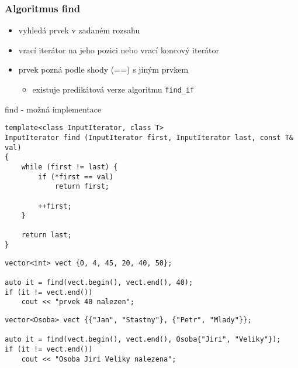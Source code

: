 

\begin{frame}[fragile]
\frametitle{Algoritmus find}
\begin{block}{}
\begin{itemize}
\item vyhledá prvek v zadaném rozsahu
\item vrací iterátor na jeho pozici nebo vrací koncový iterátor
\item prvek pozná podle shody (==) s jiným prvkem
\begin{itemize}
\item existuje predikátová verze algoritmu \lstinline|find_if|
\end{itemize}
\end{itemize}
\end{block}
\end{frame}



\begin{frame}[fragile]
\begin{block}{find - možná implementace}
\begin{lstlisting}
template<class InputIterator, class T>
InputIterator find (InputIterator first, InputIterator last, const T& val)
{
	while (first != last) {
		if (*first == val) 
			return first;
		
		++first;
	}
	
	return last;
}		
\end{lstlisting}
\end{block}
\end{frame}

\begin{frame}[fragile]
\begin{yesblock}
\begin{lstlisting}
vector<int> vect {0, 4, 45, 20, 40, 50};

auto it = find(vect.begin(), vect.end(), 40);
if (it != vect.end()) 
	cout << "prvek 40 nalezen";
\end{lstlisting}
\end{yesblock}

\begin{yesblock}
\begin{lstlisting}
vector<Osoba> vect {{"Jan", "Stastny"}, {"Petr", "Mlady"}};

auto it = find(vect.begin(), vect.end(), Osoba{"Jiri", "Veliky"});
if (it != vect.end()) 
	cout << "Osoba Jiri Veliky nalezena";
\end{lstlisting}
\end{yesblock}
\end{frame}



